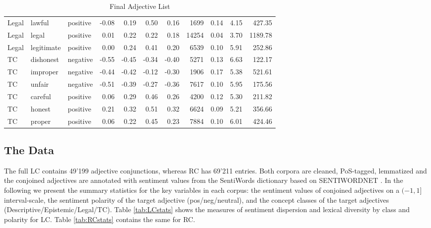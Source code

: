\documentclass{article}
\begin{document}
\begin{table}[!h]
{\begin{minipage}{\textwidth}
\begin{tabular}{lllrrrrrrrr}
  Legal & lawful & positive & -0.08 & 0.19 & 0.50 & 0.16 & 1699 & 0.14 & 4.15 & 427.35 \\ 
  Legal & legal & positive & 0.01 & 0.22 & 0.22 & 0.18 & 14254 & 0.04 & 3.70 & 1189.78 \\ 
  Legal & legitimate & positive & 0.00 & 0.24 & 0.41 & 0.20 & 6539 & 0.10 & 5.91 & 252.86 \\ 
  TC & dishonest & negative & -0.55 & -0.45 & -0.34 & -0.40 & 5271 & 0.13 & 6.63 & 122.17 \\ 
  TC & improper & negative & -0.44 & -0.42 & -0.12 & -0.30 & 1906 & 0.17 & 5.38 & 521.61 \\ 
  TC & unfair & negative & -0.51 & -0.39 & -0.27 & -0.36 & 7617 & 0.10 & 5.95 & 175.56 \\ 
  TC & careful & positive & 0.06 & 0.29 & 0.46 & 0.26 & 4200 & 0.12 & 5.30 & 211.82 \\ 
  TC & honest & positive & 0.21 & 0.32 & 0.51 & 0.32 & 6624 & 0.09 & 5.21 & 356.66 \\ 
  TC & proper & positive & 0.06 & 0.22 & 0.45 & 0.23 & 7884 & 0.10 & 6.01 & 424.46 \\ 
   \hline
\end{tabular}
\end{minipage}
}
\caption{Final Adjective List}
\label{tab:ADJlist}
\end{table}


\subsection{The Data}


The full LC contains 49'199 adjective conjunctions, whereas RC has 69'211 entries. Both corpora are cleaned, PoS-tagged, lemmatized and the conjoined adjectives are annotated with sentiment values from the SentiWords dictionary based on SENTIWORDNET \citep{Esuli2006, Baccianella2010, Guerini2013, Gatti2016}. In the following we present the summary statistics for the key variables in each corpus: the sentiment values of conjoined adjectives on a $(-1,1]$ interval-scale, the sentiment polarity of the target adjective (pos/neg/neutral), and the concept classes of the target adjectives (Descriptive/Epistemic/Legal/TC). Table \ref{tab:LCstats} shows the measures of sentiment dispersion and lexical diversity by class and polarity for LC. Table \ref{tab:RCstats} contains the same for RC. 
\end{document}
